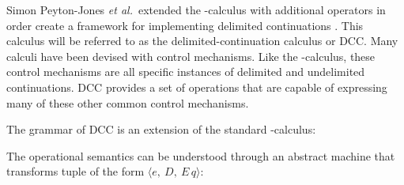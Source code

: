 Simon Peyton-Jones \textit{et al.}\ extended the \lam-calculus with additional operators in order create a framework for implementing delimited continuations \cite{JonesDS07}. This calculus will be referred to as the delimited-continuation calculus or DCC. Many calculi have been devised with control mechanisms. Like the \lmu-calculus, these control mechanisms are all specific instances of delimited and undelimited continuations. DCC provides a set of operations that are capable of expressing many of these other common control mechanisms.

The grammar of DCC is an extension of the standard \lam-calculus:

\begin{figure}[!h]
\end{figure}

The operational semantics can be understood through an abstract machine that transforms tuple of the form $\langle e,\ D,\ E\, q \rangle$:

